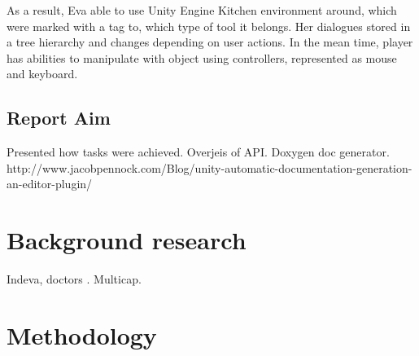 \documentclass[18pt]{article}
\numberwithin{equation}{section} %
\numberwithin{figure}{section} %
\numberwithin{table}{section} %
\begin{document}
	As a result, Eva able to use Unity Engine Kitchen environment around, which were marked with a tag to, which type of tool it belongs. Her dialogues stored in a tree hierarchy and changes depending on user actions. In the mean time, player has abilities to manipulate with object using controllers, represented as mouse and keyboard.
\subsection{Report Aim}
	Presented how tasks were achieved. Overjeis of API. Doxygen doc generator.
	http://www.jacobpennock.com/Blog/unity-automatic-documentation-generation-an-editor-plugin/
\section{Background research}
	Indeva, doctors . Multicap.
\section{Methodology}	
\end{document}
